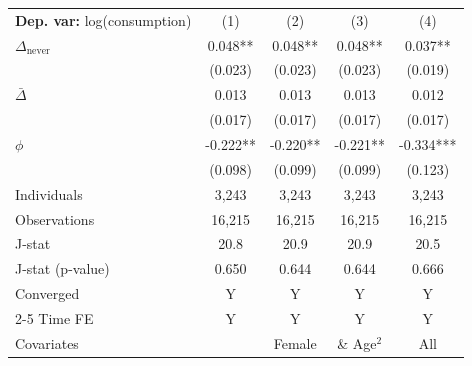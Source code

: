 \begin{tabular}{l cccc} \toprule  \textbf{Dep. var:}  log(consumption) 
                    &\multicolumn{1}{c}{(1)}   &\multicolumn{1}{c}{(2)}   &\multicolumn{1}{c}{(3)}   &\multicolumn{1}{c}{(4)}   \\

\addlinespace
$\Delta_{\text{never}}$&       0.048** &       0.048** &       0.048** &       0.037** \\
                    &     (0.023)   &     (0.023)   &     (0.023)   &     (0.019)   \\

\addlinespace
$\bar{\Delta}$      &       0.013   &       0.013   &       0.013   &       0.012   \\
                    &     (0.017)   &     (0.017)   &     (0.017)   &     (0.017)   \\

\addlinespace
$\phi$              &      -0.222** &      -0.220** &      -0.221** &      -0.334***\\
                    &     (0.098)   &     (0.099)   &     (0.099)   &     (0.123)   \\
\addlinespace
Individuals         &       3,243   &       3,243   &       3,243   &       3,243   \\
Observations        &      16,215   &      16,215   &      16,215   &      16,215   \\
J-stat              &        20.8   &        20.9   &        20.9   &        20.5   \\
J-stat (p-value)    &       0.650   &       0.644   &       0.644   &       0.666   \\
Converged           &           Y   &           Y   &           Y   &           Y   \\
\cmidrule{2-5} Time FE & Y & Y & Y & Y \\ Covariates & & Female & \& Age$^2$ & All \\ \bottomrule \end{tabular}
